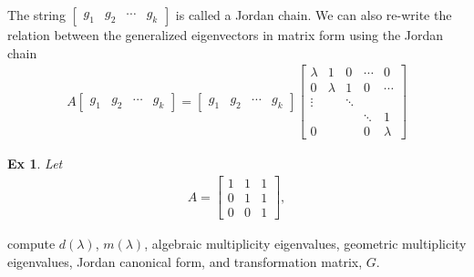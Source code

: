 \documentclass[twoside]{article}
\newtheorem{exmp}[theorem]{Ex}
\begin{document}
%
The string $\left[ \begin{array}{cccc}  g_1 & g_2 & \cdots & g_k \end{array} \right]$ is called a Jordan chain. We can also re-write the relation between 
the generalized eigenvectors in matrix form using the Jordan chain
%
\begin{align*}
	A \left[ \begin{array}{cccc}  g_1 & g_2 & \cdots & g_k \end{array} \right] = \left[ \begin{array}{cccc}  g_1 & g_2 & \cdots & g_k \end{array} \right] 
	\left[  \begin{array}{ccccc} \lambda & 1 & 0 & \cdots & 0  \\ 0 & \lambda & 1 & 0 & \cdots  \\ 
\vdots &  & \ddots &  \\ & & & \ddots & 1 \\
0 &  &  & 0 & \lambda \end{array} \right]
\end{align*}

\begin{exmp}
	Let 
\begin{align*}
A = \left[ \begin{array}{ccc} 1 & 1 & 1 \\ 0 & 1 & 1 \\ 0 & 0 & 1
\end{array} \right] , 
\end{align*}
\end{exmp}
%
compute $d(\lambda)$, $m(\lambda)$, algebraic multiplicity eigenvalues, geometric multiplicity eigenvalues, Jordan canonical form, and transformation matrix, $G$.
\end{document}
